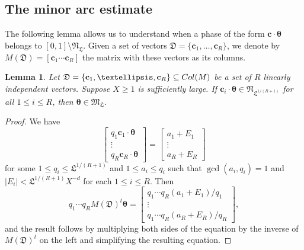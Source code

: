 \documentclass[reqno, 12pt, reqno]{amsart}
\numberwithin{equation}{section}
\newtheorem{lemma}[theorem]{Lemma}
\renewcommand{\leq}{\leqslant}
\renewcommand{\geq}{\geqslant}
\renewcommand{\c}{\mathbf{c}}
\newcommand{\btheta}{\boldsymbol{\theta}}
\renewcommand{\=}{\equiv}
\begin{document}
\subsection{The minor arc estimate}
The following lemma allows us to understand when a phase of the form $\c\cdot\btheta$  belongs to $[0,1] \setminus \mathfrak{N}_\mathfrak{L}$.
Given a set of vectors $\mathfrak{D} = \{ \c_1, \ldots, \c_{R} \}$, we denote by $M( \mathfrak{D} ) = [ \c_1 \cdots \c_{R} ]$
the matrix with these vectors as its columns.

\begin{lemma}\label{lem:linalg}
Let $\mathfrak{D} = \{ \c_1, \ldots, \c_{R} \}  \subseteq \textnormal{Col}( M )$ be a set of $R$ linearly independent vectors.
Suppose $X \geq 1$ is sufficiently large.
If $\c_i \cdot \btheta \in \mathfrak{N}_{\mathfrak{L}^{1/(R+1)} }$ for all $1 \leq i \leq R$,
then $\btheta \in \mathfrak{M}_\mathfrak{L}$.
\end{lemma}

\begin{proof}
We have
$$
\begin{bmatrix}
                                           q_1 \c_1 \cdot \btheta  \\
                                           \vdots  \\
                                           q_R \c_R \cdot \btheta
                                         \end{bmatrix}
   =  \begin{bmatrix}
                                           a_1 + E_1 \\
                                           \vdots  \\
                                           a_{R} + E_{R}
                                         \end{bmatrix}
$$
for some $1 \leq q_i \leq \mathfrak{L}^{1/(R+1)}$ and $1 \leq a_i \leq q_i$ such that $\gcd(a_i, q_i) = 1$
and $|E_i| <  \mathfrak{L}^{1/(R+1)} X^{- d}$ for each $1 \leq i \leq R$. Then
$$
q_1 \cdots q_R M( \mathfrak{D} )^{t} \btheta
   =  \begin{bmatrix}
                                            q_1 \cdots q_R (a_1 + E_1) / q_1 \\
                                           \vdots  \\
                                           q_1 \cdots q_R (a_{R} + E_{R}) /q_R
                                         \end{bmatrix},
$$
and the result follows
by multiplying both sides of the equation by the inverse of $M( \mathfrak{D} )^{t}$ on the left
and simplifying the resulting equation.
\end{proof}
\end{document}
